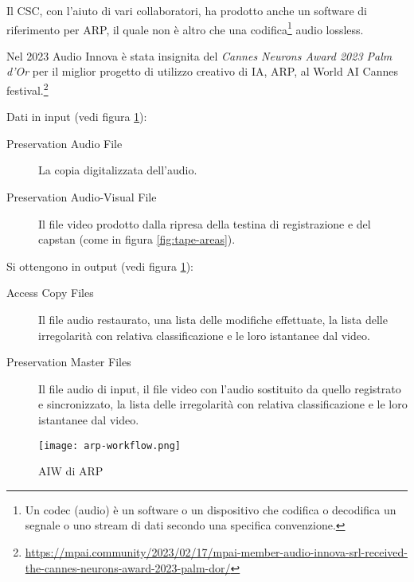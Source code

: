 Il \ac{CSC}, con l'aiuto di vari collaboratori, ha prodotto anche un software di riferimento per \ac{ARP}, il quale non è altro che una codifica\footnote{Un codec (audio) è un software o un dispositivo che codifica o decodifica un segnale o uno stream di dati secondo una specifica convenzione.} audio lossless.

Nel 2023 Audio Innova è stata insignita del \textit{Cannes Neurons Award 2023 Palm d'Or} per il miglior progetto di utilizzo creativo di IA, \ac{ARP}, al World AI Cannes festival.\footnote{\url{https://mpai.community/2023/02/17/mpai-member-audio-innova-srl-received-the-cannes-neurons-award-2023-palm-dor/}}

Dati in input (vedi figura \ref{fig:arp-workflow}):
\begin{description}
    \item[Preservation Audio File] La copia digitalizzata dell'audio.
    \item[Preservation Audio-Visual File] Il file video prodotto dalla ripresa della testina di registrazione e del capstan (come in figura \ref{fig:tape-areas}).
\end{description}

Si ottengono in output (vedi figura \ref{fig:arp-workflow}):
\begin{description}
    \item[Access Copy Files] Il file audio restaurato, una lista delle modifiche effettuate, la lista delle irregolarità con relativa classificazione e le loro istantanee dal video.
    \item[Preservation Master Files] Il file audio di input, il file video con l'audio sostituito da quello registrato e sincronizzato, la lista delle irregolarità con relativa classificazione e le loro istantanee dal video.
\end{description}

\begin{figure}[H]
    \centering
    \texttt{[image: arp-workflow.png]}
    \caption{\ac{AIW} di \acl{ARP}}
    \label{fig:arp-workflow}
\end{figure}


